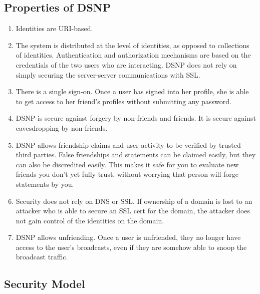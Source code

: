 \documentclass[letterpaper,11pt,oneside]{article}
\begin{document}
\subsection{Properties of DSNP}

\begin{enumerate}

\item Identities are URI-based.

\item The system is distributed at the level of identities, as opposed to
collections of identities. Authentication and authorization mechanisms are
based on the credentials of the two users who are interacting. DSNP does not
rely on simply securing the server-server communications with SSL.

\item There is a single sign-on. Once a user has signed into her profile, she
is able to get access to her friend's profiles without submitting any password.

\item DSNP is secure against forgery by non-friends and friends. It is secure
against eavesdropping by non-friends.

\item DSNP allows friendship claims and user activity to be verified by trusted
third parties. False friendships and statements can be claimed easily, but they
can also be discredited easily. This makes it safe for you to evaluate new
friends you don't yet fully trust, without worrying that person will forge
statements by you.

\item Security does not rely on DNS or SSL. If ownership of a domain is lost to
an attacker who is able to secure an SSL cert for the domain, the attacker does
not gain control of the identities on the domain.

\item DSNP allows unfriending. Once a user is unfriended, they no longer have
access to the user's broadcasts, even if they are somehow able to snoop the
broadcast traffic.

\end{enumerate}


\subsection{Security Model}
\end{document}
